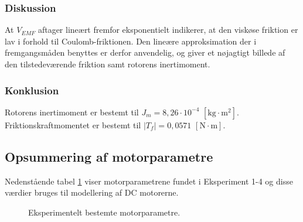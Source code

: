 \subsubsection{Diskussion}
At \(V_{EMF}\) aftager lineært fremfor eksponentielt indikerer,
at den viskøse friktion er lav i forhold til Coulomb-friktionen.
Den lineære approksimation der i fremgangsmåden benyttes er derfor anvendelig,
og giver et nøjagtigt billede af den tilstedeværende friktion samt rotorens inertimoment.
\subsubsection{Konklusion}
Rotorens inertimoment er bestemt til \(J_m=8,26\cdot10^{-4}\) \([\text{kg}\cdot{\text{m}^2}]\).
Friktionskraftmomentet er bestemt til \(\left| { T }_{ f } \right| =0,0571\) \( [\text{N} \cdot \text{m}]\).

\subsection{Opsummering af motorparametre}
\label{opsummering_af_motorparameter}
Nedenstående tabel \ref{tb:motorparametre} viser motorparametrene
 fundet i Eksperiment 1-4 og disse værdier bruges til modellering af DC motorerne.
\begin{figure}[th!]
	\centering
	
	\captionsetup{type=table}
	\caption[Motorparametre]
			{Eksperimentelt bestemte motorparametre.}
	\label{tb:motorparametre}
\end{figure}
